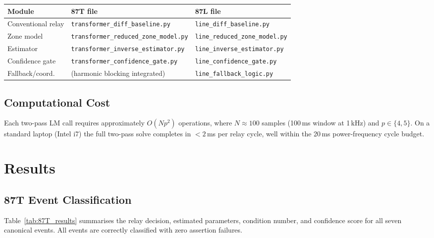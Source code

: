 \documentclass[12pt,a4paper]{article}
\begin{document}
\begin{center}
\begin{tabular}{lll}
\toprule
Module & 87T file & 87L file\\
\midrule
Conventional relay  & \texttt{transformer\_diff\_baseline.py} & \texttt{line\_diff\_baseline.py}\\
Zone model          & \texttt{transformer\_reduced\_zone\_model.py} & \texttt{line\_reduced\_zone\_model.py}\\
Estimator           & \texttt{transformer\_inverse\_estimator.py} & \texttt{line\_inverse\_estimator.py}\\
Confidence gate     & \texttt{transformer\_confidence\_gate.py} & \texttt{line\_confidence\_gate.py}\\
Fallback/coord.     & (harmonic blocking integrated) & \texttt{line\_fallback\_logic.py}\\
\bottomrule
\end{tabular}
\end{center}

\subsection{Computational Cost}

Each two-pass LM call requires approximately $O(N p^2)$ operations, where
$N \approx 100$ samples (100\,ms window at 1\,kHz) and $p \in \{4,5\}$.
On a standard laptop (Intel i7) the full two-pass solve completes in
$< 2$\,ms per relay cycle, well within the 20\,ms power-frequency cycle
budget.

\section{Results}
\label{sec:results}

\subsection{87T Event Classification}

Table~\ref{tab:87T_results} summarises the relay decision, estimated
parameters, condition number, and confidence score for all seven canonical
events.  All events are correctly classified with zero assertion failures.
\end{document}
